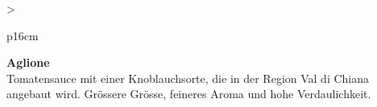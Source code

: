 \documentclass[
  beamerpaper,
  DIV=11,
  numbers=noendperiod,
  aspectratio=54]{scrreprt}
\begin{document}
\begin{table}

\caption{\label{tbl-panel-aglio}Aglione Val di
Chiana}\begin{minipage}[t]{\linewidth}

\tabularnewline

\fontsize{16}{18}\selectfont
\begin{tabular}{>{\raggedright\arraybackslash}p{16cm}}
\toprule
\begingroup\fontsize{18}{20}\selectfont \textbf{Aglione}\endgroup\\
\midrule
Tomatensauce mit einer Knoblauchsorte, die in der Region Val di Chiana angebaut wird. Grössere Grösse, feineres Aroma und hohe Verdaulichkeit.\\
\bottomrule
\end{tabular}

\end{minipage}%
\newline
\begin{minipage}[t]{\linewidth}


\end{minipage}%

\end{table}
\end{document}
